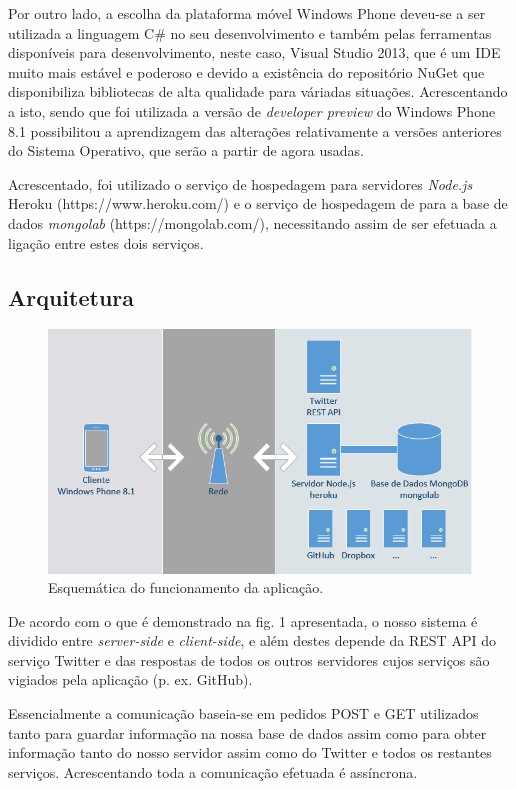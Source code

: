 \documentclass[12pt]{article}
\begin{document}
	Por outro lado, a escolha da plataforma móvel Windows Phone deveu-se a ser utilizada a linguagem C\# no seu desenvolvimento e também pelas ferramentas disponíveis para desenvolvimento, neste caso, Visual Studio 2013, que é um IDE muito mais estável e poderoso e devido a existência do repositório NuGet que disponibiliza bibliotecas de alta qualidade para váriadas situações. Acrescentando a isto, sendo que foi utilizada a versão de \textit{developer preview} do Windows Phone 8.1 possibilitou a aprendizagem das alterações relativamente a versões anteriores do Sistema Operativo, que serão a partir de agora usadas.
	
	Acrescentado, foi utilizado o serviço de hospedagem para servidores \textit{Node.js} Heroku (https://www.heroku.com/)  e o serviço de hospedagem de para a base de dados \textit{mongolab}  (https://mongolab.com/), necessitando assim de ser efetuada a ligação entre estes dois serviços.
	
\subsection{Arquitetura}	
\begin{figure}
 \centering
\includegraphics[scale=0.75]{rede.png}
 \caption{Esquemática do funcionamento da aplicação.}
 \label{figure:example}
\end{figure}

De acordo com o que é demonstrado na fig. 1 apresentada, o nosso sistema é dividido entre \textit{server-side} e \textit{client-side}, e além destes depende da REST API do serviço Twitter e das respostas de todos os outros servidores cujos serviços são vigiados pela aplicação (p. ex. GitHub).
	
	Essencialmente a comunicação baseia-se em pedidos POST e GET utilizados tanto para guardar informação na nossa base de dados assim como para obter informação tanto do nosso servidor assim como do Twitter e todos os restantes serviços. Acrescentando toda a comunicação efetuada é assíncrona.
\end{document}
